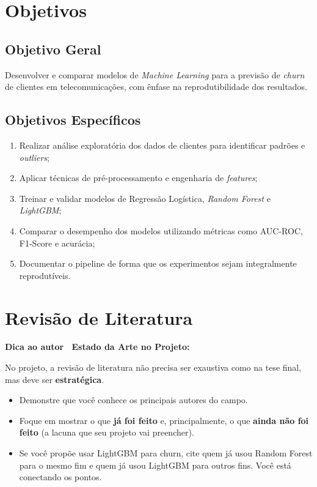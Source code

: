 \documentclass[
    article,
    12pt,
    oneside,
    a4paper,
    english,
    brazilian
    ]{abntex2}
\numberwithin{equation}{section}
\newenvironment{dica}{%
    \par\medskip
    \color{blue!60!black}\small\itshape
}{%
    \par\medskip
}
\begin{document}
\section{Objetivos}

\subsection{Objetivo Geral}

Desenvolver e comparar modelos de \textit{Machine Learning} para a previsão de \textit{churn} de clientes em telecomunicações, com ênfase na reprodutibilidade dos resultados.

\subsection{Objetivos Específicos}

\begin{enumerate}
    \item Realizar análise exploratória dos dados de clientes para identificar padrões e \textit{outliers};
    \item Aplicar técnicas de pré-processamento e engenharia de \textit{features};
    \item Treinar e validar modelos de Regressão Logística, \textit{Random Forest} e \textit{LightGBM};
    \item Comparar o desempenho dos modelos utilizando métricas como AUC-ROC, F1-Score e acurácia;
    \item Documentar o pipeline de forma que os experimentos sejam integralmente reprodutíveis.
\end{enumerate}

\section{Revisão de Literatura}

\begin{dica}
\noindent\textbf{Dica ao autor \textemdash\ Estado da Arte no Projeto:}

No projeto, a revisão de literatura não precisa ser exaustiva como na tese final, mas deve ser \textbf{estratégica}.
\begin{itemize}
    \item Demonstre que você conhece os principais autores do campo.
    \item Foque em mostrar o que \textbf{já foi feito} e, principalmente, o que \textbf{ainda não foi feito} (a lacuna que seu projeto vai preencher).
    \item Se você propõe usar LightGBM para churn, cite quem já usou Random Forest para o mesmo fim e quem já usou LightGBM para outros fins. Você está conectando os pontos.
\end{itemize}
\end{dica}
\end{document}
